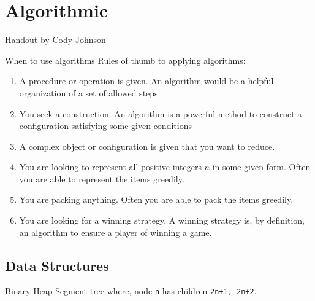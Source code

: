\graphicspath{{Pics/combi/algo/}}


\newpage\section{Algorithmic}

\faka \begin{myitemize}{} \item
    \href{https://people.bath.ac.uk/masgcs/algorithms.pdf}{Handout by Cody
Johnson} \end{myitemize} \faka

\begin{take_note*}{When to use algorithms}
    Rules of thumb to applying algorithms:
    \begin{enumerate}[left=0pt, label=\boxed{\textbf{\arabic*}}]
        \item A procedure or operation is given. An algorithm would be a
            helpful organization of a set of allowed steps
        \item You seek a construction. An algorithm is a powerful method to
            construct a configuration satisfying some given conditions
        \item A complex object or configuration is given that you want to reduce.
        \item You are looking to represent all positive integers $n$ in
            some given form. Often you are able to represent the items
            greedily.
        \item You are packing anything. Often you are able to pack the items
            greedily.
        \item You are looking for a winning strategy. A winning strategy is,
            by definition, an algorithm to ensure a player of winning a game.
    \end{enumerate}
\end{take_note*}


\subsection{Data Structures}



{Binary Heap\label{problem:binary_heap}}{
    Segment tree where, node \texttt{n} has children \texttt{2n+1, 2n+2}. 
}




